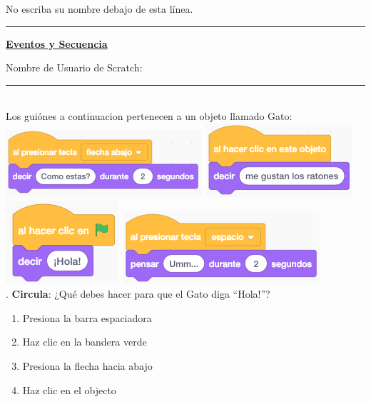 \documentclass[letterpaper,12pt]{article}
\begin{document}
\noindent No escriba su nombre debajo de esta línea. \\
\noindent \hrule
\begin{center}
{\Large \textbf{\underline{Eventos y Secuencia}}}
\end{center}
Nombre de Usuario de Scratch: \rule{4cm}{0.4pt}

\noindent \dotfill \\

\noindent Los guiónes a continuacion pertenecen a un objeto llamado Gato: \\

\includegraphics[scale=.55]{q1_script0.png} \hspace{.5cm}
\includegraphics[scale=.5]{q1_script1.png} \hspace{.5cm}
\includegraphics[scale=.5]{q1_script2.png} \hspace{.5cm}
\includegraphics[scale=.5]{q1_script3.png} \hspace{.5cm} \\

. \textbf{Circula}: ¿Qué debes hacer para que el Gato diga “Hola!”?
\renewcommand{\theenumi}{\Alph{enumi}}
\begin{enumerate}
\item Presiona la barra espaciadora
\item Haz clic en la bandera verde
\item Presiona la flecha hacia abajo
\item Haz clic en el objecto
\end{enumerate}
\end{document}
